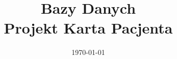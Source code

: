 \documentclass[12pt,a4paper]{article}
\begin{document}
\title{Bazy Danych\\Projekt Karta Pacjenta}
\date{\today}

\maketitle

\tableofcontents
\clearpage







\end{document}
